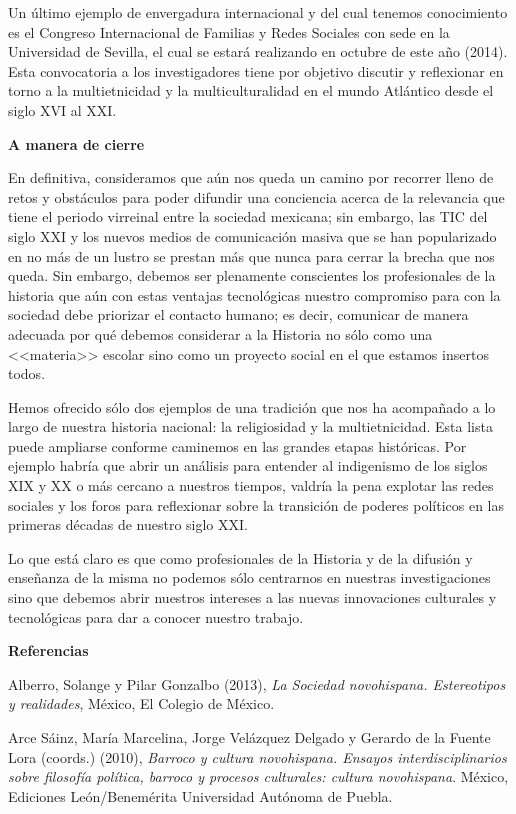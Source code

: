 Un último ejemplo de
envergadura internacional y del cual tenemos conocimiento es el Congreso
Internacional de Familias y Redes Sociales con sede en la Universidad de
Sevilla, el cual se estará realizando en octubre de este año (2014). Esta
convocatoria a los investigadores tiene por objetivo discutir y reflexionar en
torno a la multietnicidad y la multiculturalidad en el mundo Atlántico desde el
siglo XVI al XXI.


\medskip
\textbf{A manera de cierre}

En definitiva, consideramos
que aún nos queda un camino por recorrer lleno de retos y obstáculos para poder
difundir una conciencia acerca de la relevancia que tiene el periodo virreinal
entre la sociedad mexicana; sin embargo, las TIC del siglo XXI y los nuevos
medios de comunicación masiva que se han popularizado en no más de un lustro se
prestan más que nunca para cerrar la brecha que nos queda. Sin embargo, debemos
ser plenamente conscientes los profesionales de la historia que aún con estas
ventajas tecnológicas nuestro compromiso para con la sociedad debe priorizar el
contacto humano; es decir, comunicar de manera
adecuada por qué debemos
considerar a la Historia no sólo como una <<materia>> escolar sino como un
proyecto social en el que estamos insertos todos.


Hemos ofrecido sólo dos
ejemplos de una tradición que nos ha acompañado a lo largo de nuestra historia
nacional: la religiosidad y la multietnicidad. Esta lista puede ampliarse
conforme caminemos en las grandes etapas históricas. Por ejemplo habría que
abrir un análisis para entender al indigenismo de los siglos XIX y XX o más
cercano a nuestros tiempos, valdría la pena explotar las redes sociales y los
foros  para reflexionar sobre la transición de poderes políticos en las
primeras décadas de nuestro siglo XXI.


Lo que está claro es que como
profesionales de la Historia y de la difusión y enseñanza de la misma no
podemos sólo centrarnos en nuestras investigaciones sino que debemos abrir
nuestros intereses a las nuevas innovaciones culturales y tecnológicas para dar
a conocer nuestro trabajo.
\newpage

\textbf{Referencias}

\medskip
Alberro, Solange y Pilar Gonzalbo (2013), \textit{La Sociedad novohispana.
Estereotipos y realidades}, México, El Colegio de México.


Arce Sáinz, María Marcelina, Jorge Velázquez Delgado y Gerardo de la Fuente Lora
(coords.) (2010), \textit{Barroco y cultura novohispana. Ensayos
interdisciplinarios sobre filosofía política, barroco y procesos culturales:
cultura novohispana}. México, Ediciones León\slash{}Benemérita Universidad Autónoma
de Puebla.


